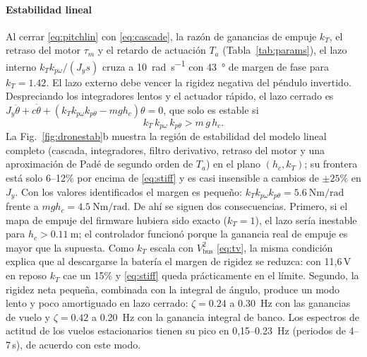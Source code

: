 \paragraph{Estabilidad lineal}
Al cerrar \eqref{eq:pitchlin} con \eqref{eq:cascade}, la razón de ganancias de empuje $k_T$, el retraso del motor $\tau_m$ y el retardo de actuación $T_a$ (Tabla~\ref{tab:params}), el lazo interno $k_Tk_{p\omega}/(J_ys)$ cruza a \SI{10}{\radian\per\second} con \SI{43}{\degree} de margen de fase para $k_T=1.42$. El lazo externo debe vencer la rigidez negativa del péndulo invertido. Despreciando los integradores lentos y el actuador rápido, el lazo cerrado es $J_y\ddot\theta+c\dot\theta+(k_Tk_{p\omega}k_{p\theta}-mgh_c)\theta=0$, que solo es estable si
\begin{equation}
  k_T\,k_{p\omega}\,k_{p\theta}>m\,g\,h_c .
  \label{eq:stiff}
\end{equation}
La Fig.~\ref{fig:dronestab}b muestra la región de estabilidad del modelo lineal completo (cascada, integradores, filtro derivativo, retraso del motor y una aproximación de Pad\'e de segundo orden de $T_a$) en el plano $(h_c,k_T)$; su frontera está solo 6--12\% por encima de \eqref{eq:stiff} y es casi insensible a cambios de $\pm25\%$ en $J_y$. Con los valores identificados el margen es pequeño: $k_Tk_{p\omega}k_{p\theta}=\SI{5.6}{\newton\metre\per\radian}$ frente a $mgh_c=\SI{4.5}{\newton\metre\per\radian}$. De ahí se siguen dos consecuencias. Primero, si el mapa de empuje del firmware hubiera sido exacto ($k_T=1$), el lazo sería inestable para $h_c>\SI{0.11}{\metre}$; el controlador funcionó porque la ganancia real de empuje es mayor que la supuesta. Como $k_T$ escala con $V_{\mathrm{bus}}^2$ \eqref{eq:tv}, la misma condición explica que al descargarse la batería el margen de rigidez se reduzca: con 11,6\,V en reposo $k_T$ cae un 15\% y \eqref{eq:stiff} queda prácticamente en el límite. Segundo, la rigidez neta pequeña, combinada con la integral de ángulo, produce un modo lento y poco amortiguado en lazo cerrado: $\zeta=0.24$ a \SI{0.30}{\hertz} con las ganancias de vuelo y $\zeta=0.42$ a \SI{0.20}{\hertz} con la ganancia integral de banco. Los espectros de actitud de los vuelos estacionarios tienen su pico en 0,15--\SI{0.23}{\hertz} (periodos de 4--7\,s), de acuerdo con este modo.

